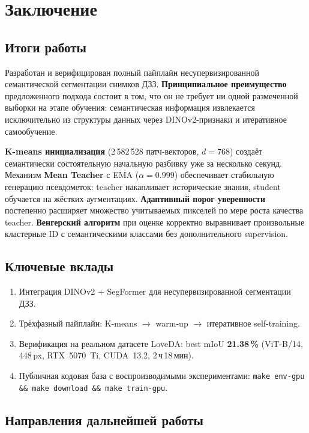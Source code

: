 \documentclass[11pt,a4paper]{article}
\begin{document}
\section{Заключение}

\subsection{Итоги работы}

Разработан и верифицирован полный пайплайн несупервизированной семантической
сегментации снимков ДЗЗ. \textbf{Принципиальное преимущество} предложенного подхода
состоит в том, что он не требует ни одной размеченной выборки на этапе обучения:
семантическая информация извлекается исключительно из структуры данных через
DINOv2-признаки и итеративное самообучение.

\textbf{K-means инициализация} (2\,582\,528 патч-векторов, $d = 768$) создаёт
семантически состоятельную начальную разбивку уже за несколько секунд. Механизм
\textbf{Mean Teacher} с EMA ($\alpha = 0.999$) обеспечивает стабильную генерацию
псевдометок: teacher накапливает исторические знания, student обучается на жёстких
аугментациях. \textbf{Адаптивный порог уверенности} постепенно расширяет множество
учитываемых пикселей по мере роста качества teacher. \textbf{Венгерский алгоритм}
при оценке корректно выравнивает произвольные кластерные ID с семантическими классами
без дополнительного supervision.

\subsection{Ключевые вклады}

\begin{enumerate}
  \item Интеграция DINOv2 + SegFormer для несупервизированной сегментации ДЗЗ.
  \item Трёхфазный пайплайн: K-means $\to$ warm-up $\to$ итеративное self-training.
  \item Верификация на реальном датасете LoveDA: best mIoU \textbf{21.38\,\%}
        (ViT-B/14, 448\,px, RTX~5070~Ti, CUDA~13.2, 2\,ч\,18\,мин).
  \item Публичная кодовая база с воспроизводимыми экспериментами:
        \texttt{make env-gpu \&\& make download \&\& make train-gpu}.
\end{enumerate}

\subsection{Направления дальнейшей работы}
\end{document}
